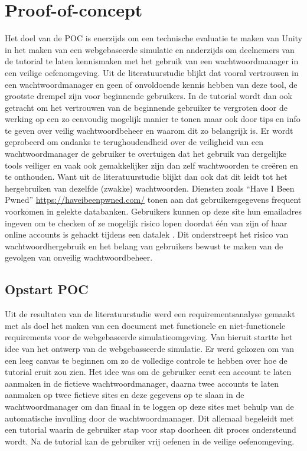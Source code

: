 \chapter{Proof-of-concept}

Het doel van de POC is enerzijds om een technische evaluatie te maken van Unity in het maken van een webgebaseerde simulatie en anderzijds om deelnemers van de tutorial te laten kennismaken met het gebruik van een wachtwoordmanager in een veilige oefenomgeving. Uit de literatuurstudie blijkt dat vooral vertrouwen in een wachtwoordmanager en geen of onvoldoende kennis hebben van deze tool, de grootste drempel zijn voor beginnende gebruikers.
In de tutorial wordt dan ook getracht om het vertrouwen van de beginnende gebruiker te vergroten door de werking op een zo eenvoudig mogelijk manier te tonen maar ook door tips en info te geven over veilig wachtwoordbeheer en waarom dit zo belangrijk is. Er wordt geprobeerd om ondanks te terughoudendheid over de veiligheid van een wachtwoordmanager de gebruiker te overtuigen dat het gebruik van dergelijke tools veiliger en vaak ook gemakkelijker zijn dan zelf wachtwoorden te creëren en te onthouden.
Want uit de literatuurstudie blijkt dan ook dat dit leidt tot het hergebruiken van dezelfde (zwakke) wachtwoorden. Diensten zoals ``Have I Been Pwned'' \url{https://haveibeenpwned.com/} tonen aan dat gebruikersgegevens frequent voorkomen in gelekte databanken. Gebruikers kunnen op deze site hun emailadres ingeven om te checken of ze mogelijk risico lopen doordat één van zijn of haar online accounts is gehackt tijdens een datalek \autocite{Hunt}.  
Dit onderstreept het risico van wachtwoordhergebruik en het belang van gebruikers bewust te maken van de gevolgen van onveilig wachtwoordbeheer.

\section{Opstart POC}

Uit de resultaten van de literatuurstudie werd een requirementsanalyse gemaakt met als doel het maken van een document met functionele en niet-functionele requirements voor de webgebaseerde simulatieomgeving. Van hieruit startte het idee van het ontwerp van de webgebasseerde simulatie.
Er werd gekozen om van een leeg canvas te beginnen om zo de volledige controle te hebben over hoe de tutorial eruit zou zien. Het idee was om de gebruiker eerst een account te laten aanmaken in de fictieve wachtwoordmanager, daarna twee accounts te laten aanmaken op twee fictieve sites en deze gegevens op te slaan in de wachtwoordmanager om dan finaal in te loggen op deze sites met behulp van de automatische invulling door de wachtwoordmanager. Dit allemaal begeleidt met een tutorial waarin de gebruiker stap voor stap doorheen dit proces ondersteund wordt.
Na de tutorial kan de gebruiker vrij oefenen in de veilige oefenomgeving. 

